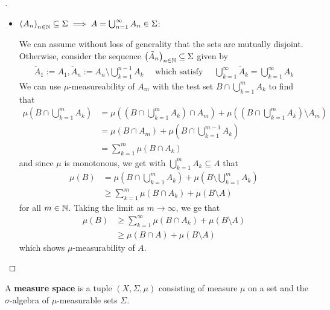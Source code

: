 \begin{proof}[]
\begin{itemize}
  \item $\left(A_{n}\right)_{n \in \mathbb{N}} \subseteq \Sigma \implies A = \bigcup_{n=1}^{\infty}A_n \in \Sigma$:

    We can assume without loss of generality that the sets are mutually disjoint. Otherwise, consider the sequence $\left(\tilde{A}_{n}\right)_{n \in \mathbb{N}} \subseteq \Sigma$ given by
    \begin{align*}
      \tilde{A}_1 := A_1, \tilde{A}_n := A_n \setminus \bigcup_{k=1}^{n-1}A_k \quad\text{ which satisfy } \quad \bigcup_{k=1}^{\infty}\tilde{A}_k = \bigcup_{k=1}^{\infty}A_k
    \end{align*}
    We can use $\mu$-measureability of $A_m$ with the test set $B\cap \bigcup_{k=1}^{m}A_k$ to find that
    \begin{align*}
      \mu \left(
        B \cap \bigcup_{k=1}^{m}A_k
      \right)
      &=
      \mu \left(
        \left(
          B \cap \bigcup_{k=1}^{m}A_k
        \right)
        \cap A_m
      \right)
      +
      \mu \left(
        \left(
          B \cap \bigcup_{k=1}^{m}A_k
        \right)
        \setminus A_m
      \right)
      \\
      &=
      \mu(B \cap A_m)
      +
      \mu \left(
        B \cap \bigcup_{k=1}^{m-1}A_k
      \right)
      \\
      &= \sum_{k=1}^{m} \mu(B \cap A_k)
    \end{align*}  
    and since $\mu$ is monotonous, we get with $\bigcup_{k=1}^{m}A_k \subseteq A$ that
    \begin{align*}
      \mu(B)
      &=
      \mu \left(
        B \cap \bigcup_{k=1}^{m}A_k
      \right)
      +
      \mu \left(
        B \setminus \bigcup_{k=1}^{m}A_k
      \right)
      \\
      &\geq \sum_{k=1}^{m} \mu(B \cap A_k) + \mu(B \setminus A)
    \end{align*}
    for all $m \in \mathbb{N}$. Taking the limit as $m \to \infty$, we ge that 
    \begin{align*}
      \mu(B) &\geq \sum_{k=1}^{\infty}\mu(B \cap A_k) + \mu(B \setminus A)\\
      &\geq
      \mu(B \cap A) + \mu(B \setminus A)
    \end{align*}
    which shows $\mu$-measurability of $A$.
\end{itemize}
\end{proof}




\begin{dfn}[]
  A \textbf{measure space} is a tuple $(X, \Sigma, \mu)$ consisting of measure $\mu$ on a set and the $\sigma$-algebra of $\mu$-measurable sets $\Sigma$.
\end{dfn}


